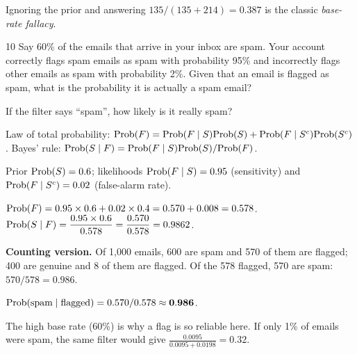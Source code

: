 \documentclass[11pt]{article}
\begin{document}
\begin{takeaway}
Ignoring the prior and answering $135/(135+214)=0.387$ is the classic \emph{base-rate fallacy}.
\end{takeaway}


\begin{problem}{10}
Say 60\% of the emails that arrive in your inbox are spam. Your account correctly flags spam emails as spam with probability 95\% and incorrectly flags other emails as spam with probability 2\%. Given that an email is flagged as spam, what is the probability it is actually a spam email?
\end{problem}

\begin{restate}
If the filter says ``spam'', how likely is it really spam?
\end{restate}

\begin{recall}
Law of total probability: $\mathrm{Prob}(F)=\mathrm{Prob}(F\mid S)\mathrm{Prob}(S)+\mathrm{Prob}(F\mid S^c)\mathrm{Prob}(S^c)$. Bayes' rule: $\mathrm{Prob}(S\mid F)=\mathrm{Prob}(F\mid S)\mathrm{Prob}(S)/\mathrm{Prob}(F)$.
\end{recall}

\begin{keyidea}
Prior $\mathrm{Prob}(S)=0.6$; likelihoods $\mathrm{Prob}(F\mid S)=0.95$ (sensitivity) and $\mathrm{Prob}(F\mid S^c)=0.02$ (false-alarm rate).
\end{keyidea}

\solution
{}
$\mathrm{Prob}(F)=0.95\times0.6+0.02\times0.4=0.570+0.008=0.578$.
$\mathrm{Prob}(S\mid F)=\dfrac{0.95\times0.6}{0.578}=\dfrac{0.570}{0.578}=0.9862$.

\begin{sanity}
\textbf{Counting version.} Of 1{,}000 emails, 600 are spam and 570 of them are flagged; 400 are genuine and 8 of them are flagged. Of the 578 flagged, 570 are spam: $570/578=0.986$. \checkmark
\end{sanity}

\begin{answer}
$\mathrm{Prob}(\text{spam}\mid\text{flagged})=0.570/0.578\approx\mathbf{0.986}$.
\end{answer}

\begin{takeaway}
The high base rate (60\%) is why a flag is so reliable here. If only 1\% of emails were spam, the same filter would give $\frac{0.0095}{0.0095+0.0198}=0.32$.
\end{takeaway}
\end{document}
